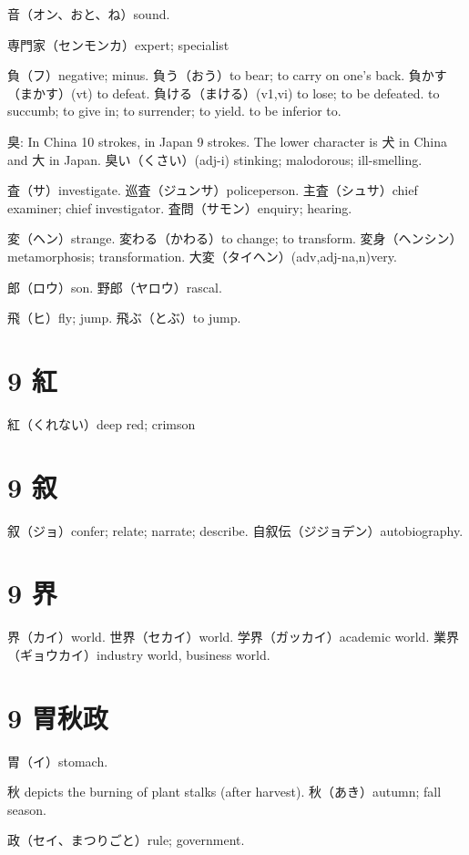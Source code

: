 音（オン、おと、ね）sound.

専門家（センモンカ）expert; specialist

負（フ）negative; minus.
負う（おう）to bear; to carry on one's back.
負かす（まかす）(vt) to defeat.
負ける（まける）(v1,vi)
to lose; to be defeated.
to succumb; to give in; to surrender; to yield.
to be inferior to.

臭: In China 10 strokes, in Japan 9 strokes.
The lower character is 犬 in China and 大 in Japan.
臭い（くさい）(adj-i) stinking; malodorous; ill-smelling.

査（サ）investigate.
巡査（ジュンサ）policeperson.
主査（シュサ）chief examiner; chief investigator.
査問（サモン）enquiry; hearing.

変（ヘン）strange.
変わる（かわる）to change; to transform.
変身（ヘンシン）metamorphosis; transformation.
大変（タイヘン）(adv,adj-na,n)very.

郎（ロウ）son.
野郎（ヤロウ）rascal.

飛（ヒ）fly; jump.
飛ぶ（とぶ）to jump.

\section{9 紅}

紅（くれない）deep red; crimson

\section{9 叙}

叙（ジョ）confer; relate; narrate; describe.
自叙伝（ジジョデン）autobiography.

\section{9 界}

界（カイ）world.
世界（セカイ）world.
学界（ガッカイ）academic world.
業界（ギョウカイ）industry world, business world.

\section{9 胃秋政}

胃（イ）stomach.

秋 depicts the burning of plant stalks (after harvest).
秋（あき）autumn; fall season.

政（セイ、まつりごと）rule; government.

